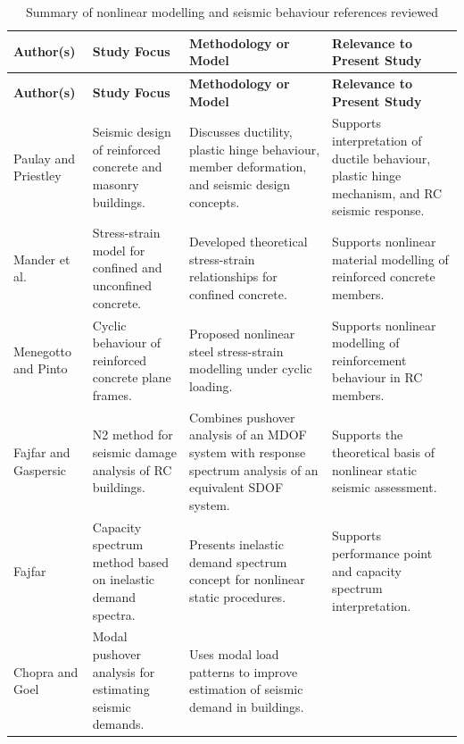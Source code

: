 \begin{longtable}{@{}p{3.25cm}p{3.30cm}p{3.35cm}p{2.90cm}@{}}
\caption{Summary of nonlinear modelling and seismic behaviour references reviewed}\label{tab:literature_nonlinear_modelling}\\
\hline\hline
\textbf{Author(s)} & \textbf{Study Focus} & \textbf{Methodology or Model} & \textbf{Relevance to Present Study} \\ \hline
\endfirsthead
\hline\hline
\textbf{Author(s)} & \textbf{Study Focus} & \textbf{Methodology or Model} & \textbf{Relevance to Present Study} \\ \hline
\endhead
Paulay and Priestley\newline \cite{paulay1992seismic}
& Seismic design of reinforced concrete and masonry buildings.
& Discusses ductility, plastic hinge behaviour, member deformation, and seismic design concepts.
& Supports interpretation of ductile behaviour, plastic hinge mechanism, and RC seismic response. \\ \hline
Mander et al.\newline \cite{mander1988confined}
& Stress-strain model for confined and unconfined concrete.
& Developed theoretical stress-strain relationships for confined concrete.
& Supports nonlinear material modelling of reinforced concrete members. \\ \hline
Menegotto and Pinto\newline \cite{menegotto1973cyclic}
& Cyclic behaviour of reinforced concrete plane frames.
& Proposed nonlinear steel stress-strain modelling under cyclic loading.
& Supports nonlinear modelling of reinforcement behaviour in RC members. \\ \hline
Fajfar and Gaspersic\newline \cite{fajfar1996n2}
& N2 method for seismic damage analysis of RC buildings.
& Combines pushover analysis of an MDOF system with response spectrum analysis of an equivalent SDOF system.
& Supports the theoretical basis of nonlinear static seismic assessment. \\ \hline
Fajfar\newline \cite{fajfar1999capacity}
& Capacity spectrum method based on inelastic demand spectra.
& Presents inelastic demand spectrum concept for nonlinear static procedures.
& Supports performance point and capacity spectrum interpretation. \\ \hline
Chopra and Goel\newline \cite{chopra2002modal}
& Modal pushover analysis for estimating seismic demands.
& Uses modal load patterns to improve estimation of seismic demand in buildings.

\end{longtable}
